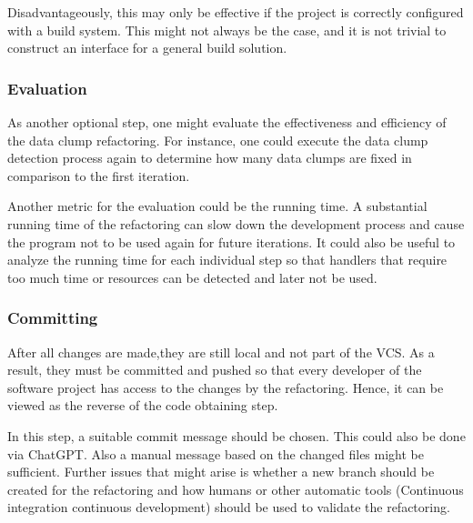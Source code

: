 Disadvantageously, this may only be effective if the project is correctly configured with a build system. This might not always be the case, and it is not trivial to construct an interface for a general build solution. 

\subsubsection{Evaluation}

As another optional step, one might evaluate the effectiveness and efficiency of the data clump refactoring. For instance, one could execute the data clump detection process again to determine how many data clumps are fixed in comparison to the first iteration. 

Another metric for the evaluation could be the running time. A substantial running time of the refactoring can slow down the development process and cause the program not to be used again for future iterations. It could also be useful to analyze the running time for each individual step so that handlers that require too much time or resources can be detected and later not be used. 

\subsubsection{Committing}

After all changes are made,they  are still local and not part of the \ac{VCS}. As a result, they must be committed and pushed so that every developer of the software project has access to the changes by the refactoring. Hence, it can be viewed as the reverse of the code obtaining step. 

In this step, a suitable commit message should be chosen. This could also be done via ChatGPT.    Also a manual message based on the changed files might be sufficient. Further issues that might arise is whether a new branch should be created for the refactoring and how humans or other automatic tools (Continuous integration continuous development) should be used to validate the refactoring.  